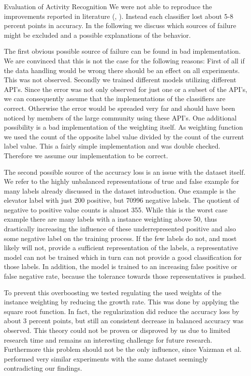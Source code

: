 \begin{section}{Evaluation of Activity Recognition}
	We were not able to reproduce the improvements reported in literature (\cite{Vaizman18}, \cite{Saeed18}). Instead each classifier lost about 5-8 percent points in accuracy. In the following we discuss which sources of failure might be excluded and a possible explanations of the behavior.
	 
	The first obvious possible source of failure can be found in bad implementation. We are convinced that this is not the case for the following reasons: First of all if the data handling would be wrong there should be an effect on all experiments. This was not observed. Secondly we trained different models utilizing different API's. Since the error was not only observed for just one or a subset of the API's, we can consequently assume that the implementations of the classifiers are correct. Otherwise the error would be spreaded very far and should have been noticed by members of the large community using these API's. One additional possibility is a bad implementation of the weighting itself. As weighting function we used the count of the opposite label value divided by the count of the current label value. This a fairly simple implementation and was double checked. Therefore we assume our implementation to be correct. 
	
	The second possible source of the accuracy loss is an issue with the dataset itself. We refer to the highly unbalanced representations of true and false example for many labels already discussed in the dataset introduction. One example is the elevator label with just 200 positive, but 70996 negative labels. The quotient of negative to positive value counts is almost 355. While this is the worst case example there are many labels with a instance weighting above 50, thus drastically increasing the influence of these underrepresented positive and also some negative label on the training process. If the few labels do not, and most likely will not, provide a sufficient representation of the labels, a representative model can not be trained which in turn can not provide a good classification for those labels. In addition, the model is trained to an increasing false positive or false negative rate, because the tolerance towards those representatives is pushed.
	
	To prevent this overboosting we tested regulating the used weights of the instance weighting by reducing the growth rate. This was done by applying the square root function. In fact, the regularization did reduce the accuracy loss by about 3 percent points, but still an consistent decrease in balanced accuracy was observed. This theory could not be proven or disproved by us due to limited research time and remains an interesting challenge for future research. Furthermore this problem should not be the only influence, since Vaizman et al. performed very similar experiments with the same dataset seemingly contradicting our findings.
	

\end{section}
